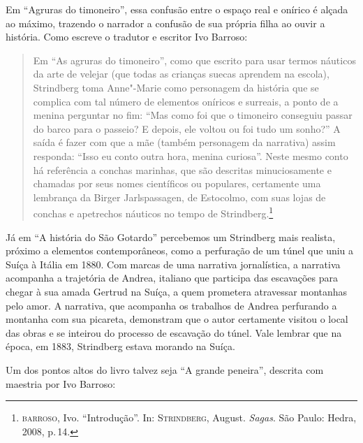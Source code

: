 Em ``Agruras do timoneiro'', essa confusão entre o espaço real e onírico é alçada ao máximo, trazendo o narrador a confusão de sua própria filha ao ouvir a história. Como escreve o tradutor e escritor Ivo Barroso:

\begin{quote}
Em ``As agruras
do timoneiro'', como que escrito para usar termos náuticos da arte de
velejar (que todas as crianças suecas aprendem na escola), Strindberg
toma Anne"-Marie como personagem da história que se complica com tal
número de elementos oníricos e surreais, a ponto de a menina perguntar
no fim: ``Mas como foi que o timoneiro conseguiu passar do barco para o
passeio? E depois, ele voltou ou foi tudo um sonho?'' A saída é fazer
com que a mãe (também personagem da narrativa) assim responda: ``Isso eu
conto outra hora, menina curiosa''. Neste mesmo conto há referência a
conchas marinhas, que são descritas minuciosamente e chamadas por seus
nomes científicos ou populares, certamente uma lembrança da Birger
Jarlspassagen, de Estocolmo, com suas lojas de conchas e apetrechos
náuticos no tempo de Strindberg.\footnote{\textsc{barroso}, Ivo. ``Introdução''. In: \textsc{Strindberg}, August. \textit{Sagas}. São Paulo: Hedra, 2008, p.\,14.}
\end{quote}

Já em ``A história do São Gotardo'' percebemos um Strindberg mais realista, próximo a elementos contemporâneos, como a perfuração de um túnel que uniu a Suíça à Itália em 1880. Com marcas de uma narrativa jornalística, a narrativa acompanha a trajetória de Andrea, italiano que participa das escavações para chegar à sua amada Gertrud na Suíça, a quem prometera atravessar montanhas pelo amor. A narrativa, que acompanha os trabalhos de Andrea perfurando a montanha com sua picareta, demonstram que o autor certamente visitou o local das obras e se inteirou do processo de escavação do túnel. Vale lembrar que na época, em 1883, Strindberg estava morando na Suíça.

Um dos pontos altos do livro talvez seja ``A grande peneira'', descrita com maestria por Ivo Barroso:

